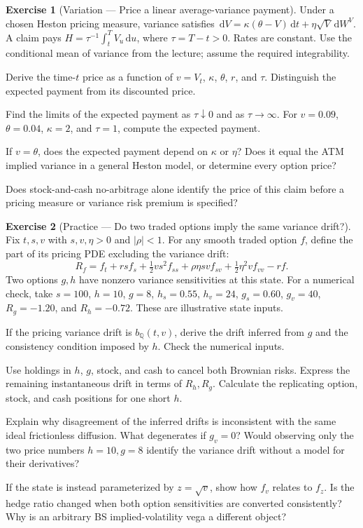 \documentclass[11pt]{article}
\newcommand{\Qbb}{\mathbb Q}
\newcommand{\dd}{\,\mathrm d}
\theoremstyle{definition}
\newtheorem{exercise}{Exercise}[section]
\begin{document}
\begin{exercise}[Variation --- Price a linear average-variance payment]
Under a chosen Heston pricing measure, variance satisfies
\(\dd V=\kappa(\theta-V)\dd t+\eta\sqrt V\dd W^V\).
A claim pays \(H=\tau^{-1}\int_t^T V_u\dd u\), where
\(\tau=T-t>0\). Rates are constant. Use the conditional mean of variance
from the lecture; assume the required integrability.
\begin{exparts}
\item Derive the time-\(t\) price as a function of \(v=V_t\), \(\kappa\), \(\theta\), \(r\), and \(\tau\). Distinguish the expected payment from its discounted price.
\item Find the limits of the expected payment as \(\tau\downarrow0\) and as \(\tau\to\infty\). For \(v=0.09\), \(\theta=0.04\), \(\kappa=2\), and \(\tau=1\), compute the expected payment.
\item If \(v=\theta\), does the expected payment depend on \(\kappa\) or \(\eta\)? Does it equal the ATM implied variance in a general Heston model, or determine every option price?
\item Does stock-and-cash no-arbitrage alone identify the price of this claim before a pricing measure or variance risk premium is specified?
\end{exparts}
\end{exercise}

\begin{exercise}[Practice --- Do two traded options imply the same variance drift?]
Fix \(t,s,v\) with \(s,v,\eta>0\) and \(|\rho|<1\). For any smooth
traded option \(f\), define the part of its pricing PDE excluding the
variance drift:
\[
R_f=f_t+rsf_s+\tfrac12vs^2f_{ss}
+\rho\eta svf_{sv}+\tfrac12\eta^2vf_{vv}-rf.
\]
Two options \(g,h\) have nonzero variance sensitivities at this state.
For a numerical check, take \(s=100\), \(h=10\), \(g=8\),
\(h_s=0.55\), \(h_v=24\), \(g_s=0.60\), \(g_v=40\),
\(R_g=-1.20\), and \(R_h=-0.72\). These are illustrative state inputs.
\begin{exparts}
\item If the pricing variance drift is \(b_{\Qbb}(t,v)\), derive the drift inferred from \(g\) and the consistency condition imposed by \(h\). Check the numerical inputs.
\item Use holdings in \(h\), \(g\), stock, and cash to cancel both Brownian risks. Express the remaining instantaneous drift in terms of \(R_h,R_g\). Calculate the replicating option, stock, and cash positions for one short \(h\).
\item Explain why disagreement of the inferred drifts is inconsistent with the same ideal frictionless diffusion. What degenerates if \(g_v=0\)? Would observing only the two price numbers \(h=10,g=8\) identify the variance drift without a model for their derivatives?
\item If the state is instead parameterized by \(z=\sqrt v\), show how \(f_v\) relates to \(f_z\). Is the hedge ratio changed when both option sensitivities are converted consistently? Why is an arbitrary BS implied-volatility vega a different object?
\end{exparts}
\end{exercise}
\end{document}
